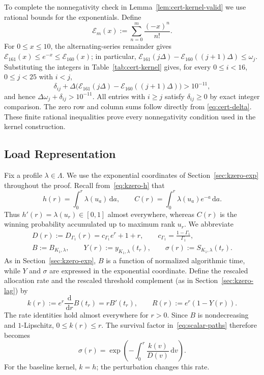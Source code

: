 \documentclass[11pt]{article}
\theoremstyle{definition}
\theoremstyle{remark}
\newcommand{\dd}{\,\mathrm d}
\begin{document}
To complete the nonnegativity check in
Lemma~\ref{lem:cert-kernel-valid} we use rational bounds for the exponentials.  Define
\[
 \mathcal E_m(x):=\sum_{n=0}^m\frac{(-x)^n}{n!}.
\]
For $0\le x\le10$, the alternating-series remainder gives
$\mathcal E_{161}(x)\le e^{-x}\le \mathcal E_{160}(x)$; in particular, $\mathcal E_{161}(j\Delta)-\mathcal E_{160}((j+1)\Delta)\le\omega_j$.
Substituting the integers in Table~\ref{tab:cert-kernel} gives, for
every $0\le i<16$, $0\le j<25$ with $i<j$,
\[
 \delta_{ij}+\Delta\bigl(\mathcal E_{161}(j\Delta)
                       -\mathcal E_{160}((j+1)\Delta)\bigr)>10^{-11},
\]
and hence $\Delta\omega_j+\delta_{ij}>10^{-11}$.
All entries with $i\ge j$ satisfy $\delta_{ij}\ge0$ by exact integer
comparison.  The zero row and column sums follow directly from
\eqref{eq:cert-delta}.  These finite rational inequalities prove every
nonnegativity condition used in the kernel construction.

\subsection{Load Representation}\label{app:cert-load}

Fix a profile $\lambda\in\Lambda$.  We use the exponential coordinates
of Section~\ref{sec:kzero-exp} throughout the proof.
Recall from~\eqref{eq:kzero-h} that
\[
 h(r)=\int_0^r\lambda(u_a)\dd a,
 \qquad C(r)=\int_0^r\lambda(u_a)e^{-a}\dd a.
\]
Thus $h'(r)=\lambda(u_r)\in[0,1]$ almost everywhere, whereas
$C(r)$ is the winning probability accumulated up to maximum rank $u_r$.
We abbreviate
\begin{gather}
 D(r):=D_{\Gamma_1}(r)=c_{\Gamma_1}e^r+1+r,
 \qquad c_{\Gamma_1}=\frac{1-\Gamma_1}{\Gamma_1},
 \label{eq:cert-D}\\
 B:=B_{K_1,\lambda},\qquad
 Y(r):=y_{K_1,\lambda}(t_r),\qquad
 \sigma(r):=S_{K_1,\lambda}(t_r).
 \label{eq:cert-abbreviations}
\end{gather}
As in Section~\ref{sec:kzero-exp}, $B$ is a function of normalized
algorithmic time, while $Y$ and $\sigma$ are expressed in the exponential
coordinate.  Define the rescaled allocation rate and the rescaled threshold complement (as in Section~\ref{sec:kzero-lag}) by
\begin{equation}\label{eq:cert-kSR}
 k(r):=e^r\frac{\dd}{\dd r}B(t_r)=rB'(t_r),
 \qquad R(r):=e^r(1-Y(r)).
\end{equation}
The rate identities hold almost everywhere for $r>0$.
Since $B$ is nondecreasing and $1$-Lipschitz, $0\le k(r)\le r$.
The survival factor in~\eqref{eq:scalar-paths} therefore becomes
\[
 \sigma(r)=\exp\!\left(-\int_0^r\frac{k(v)}{D(v)}\dd v\right).
\]
For the baseline kernel, $k=h$; the perturbation changes this rate.
\end{document}
